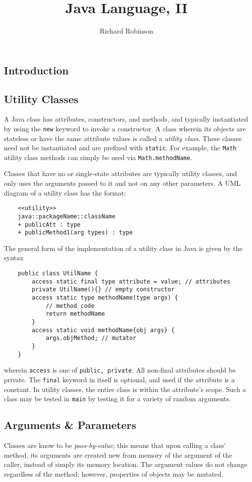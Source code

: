 \documentclass[letterpaper, openany, justified]{tufte-book}
\title{Java Language, II}
\author{Richard Robinson}
\newcommand{\cd}[1]{\lstinline{#1}}
\begin{document}
\maketitle
\tableofcontents
\setlength{\parindent}{0pt}
\begin{fullwidth}

\chapter{Introduction}

\section{Utility Classes}
A Java class has attributes, constructors, and methods, and typically instantiated by using the \cd{new} keyword to invoke a constructor. A class wherein its objects are stateless or have the same attribute values is called a \emph{utility class}. These classes need not be instantiated and are prefixed with \cd{static}. For example, the \cd{Math} utility class methods can simply be used via \cd{Math.methodName}.

\bigskip
Classes that have no or single-state attributes are typically utility classes, and only uses the arguments passed to it and not on any other parameters. A UML diagram of a utility class has the format:
\begin{lstlisting}
    <<utility>>
    java::packageName::className
    + publicAtt : type
    + publicMethod1(arg types) : type
\end{lstlisting}
The general form of the implementation of a utility class in Java is given by the syntax
\begin{lstlisting}
    public class UtilName {
        access static final type attribute = value; // attributes
        private UtilName(){} // empty constructor
        access static type methodName(type args) {
            // method code
            return methodName
        }
        access static void methodName{obj args} {
            args.objMethod; // mutator
        }
    }
\end{lstlisting}
wherein \cd{access} is one of \cd{public, private}. All non-final attributes should be private. The \cd{final} keyword in itself is optional, and used if the attribute is a constant. In utility classes, the entire class is within the attribute's scope. Such a class may be tested in \cd{main} by testing it for a variety of random arguments.

\section{Arguments \& Parameters}
Classes are know to be \emph{pass-by-value}; this means that upon calling a class' method, its arguments are created new from memory of the argument of the caller, instead of simply its memory location. The argument values do not change regardless of the method; however, properties of objects may be mutated.


\end{fullwidth}
\end{document}
